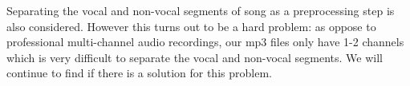 \documentclass[paper=a4, fontsize=11pt]{scrartcl}
\begin{document}
Separating the vocal and non-vocal segments of song as a preprocessing step is also considered. However this turns out to be a hard problem: as oppose to professional multi-channel audio recordings, our mp3 files only have 1-2 channels which is very difficult to separate the vocal and non-vocal segments. We will continue to find if there is a solution for this problem.

%
%


\end{document}
